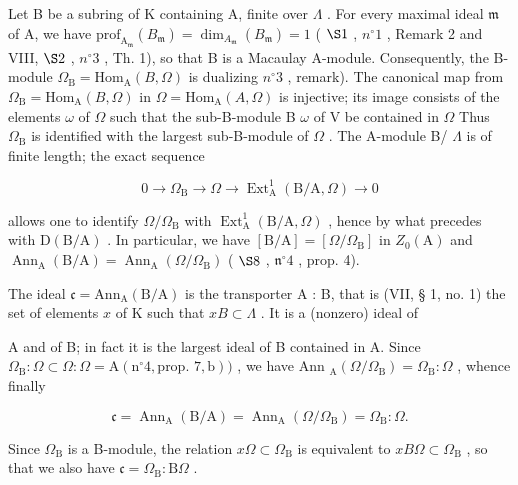 Let B be a subring of K containing A, finite over \(\Lambda\) . For every maximal ideal \(\mathfrak{m}\) of A, we have \(\mathrm{prof}_{\mathrm{A}_{\mathfrak{m}}}(B_{\mathfrak{m}}) = \dim_{A_{\mathfrak{m}}}(B_{\mathfrak{m}}) = 1\) ( \(\S 1\) , \(n^{\circ} 1\) , Remark 2 and VIII, \(\S 2\) , \(n^{\circ} 3\) , Th. 1), so that B is a Macaulay A-module. Consequently, the B-module \(\Omega_{\mathrm{B}} = \mathrm{Hom}_{\mathrm{A}}(B, \Omega)\) is dualizing \(n^{\circ} 3\) , remark). The canonical map from \(\Omega_{\mathrm{B}} = \mathrm{Hom}_{\mathrm{A}}(B, \Omega)\) in \(\Omega = \mathrm{Hom}_{\mathrm{A}}(A, \Omega)\) is injective; its image consists of the elements \(\omega\) of \(\Omega\) such that the sub-B-module B \(\omega\) of V be contained in \(\Omega\) Thus \(\Omega_{\mathrm{B}}\) is identified with the largest sub-B-module of \(\Omega\) . The A-module B/ \(\Lambda\) is of finite length; the exact sequence

\[
0 \to \Omega_ {\mathrm{B}} \to \Omega \to \operatorname{Ext} _ {\mathrm{A}} ^ {1} (\mathrm{B/A}, \Omega) \to 0
\]

allows one to identify \(\Omega/\Omega_{\mathrm{B}}\) with \(\operatorname{Ext}_{\mathrm{A}}^{1}(\mathrm{B}/\mathrm{A},\Omega)\) , hence by what precedes with \(\mathrm{D}(\mathrm{B}/\mathrm{A})\) . In particular, we have \([\mathrm{B}/\mathrm{A}] = [\Omega/\Omega_{\mathrm{B}}]\) in \(Z_{0}(\mathrm{A})\) and \(\operatorname{Ann}_{\mathrm{A}}(\mathrm{B}/\mathrm{A}) = \operatorname{Ann}_{\mathrm{A}}(\Omega/\Omega_{\mathrm{B}})\) ( \(\S 8\) , \(\mathfrak{n}^{\circ}4\) , prop. 4).

The ideal \(\mathfrak{c} = \mathrm{Ann}_{\mathrm{A}}(\mathrm{B / A})\) is the transporter A : B, that is (VII, § 1, no. 1) the set of elements \(x\) of K such that \(xB \subset \Lambda\) . It is a (nonzero) ideal of

A and of B; in fact it is the largest ideal of B contained in A. Since \(\Omega_{\mathrm{B}} : \Omega \subset \Omega : \Omega = \mathrm{A} (\mathrm{n}^{\circ} 4, \text{prop. } 7, \mathrm{b}))\) , we have Ann \(_{\mathrm{A}}(\Omega/\Omega_{\mathrm{B}}) = \Omega_{\mathrm{B}} : \Omega\) , whence finally

\[
\mathfrak {c} = \operatorname{Ann} _ {\mathrm{A}} (\mathrm{B/A}) = \operatorname{Ann} _ {\mathrm{A}} (\Omega / \Omega_ {\mathrm{B}}) = \Omega_ {\mathrm{B}}: \Omega .
\]

Since \(\Omega_{\mathrm{B}}\) is a B-module, the relation \(x\Omega \subset \Omega_{\mathrm{B}}\) is equivalent to \(xB\Omega \subset \Omega_{\mathrm{B}}\) , so that we also have \(\mathfrak{c} = \Omega_{\mathrm{B}}: \mathrm{B}\Omega\) .

